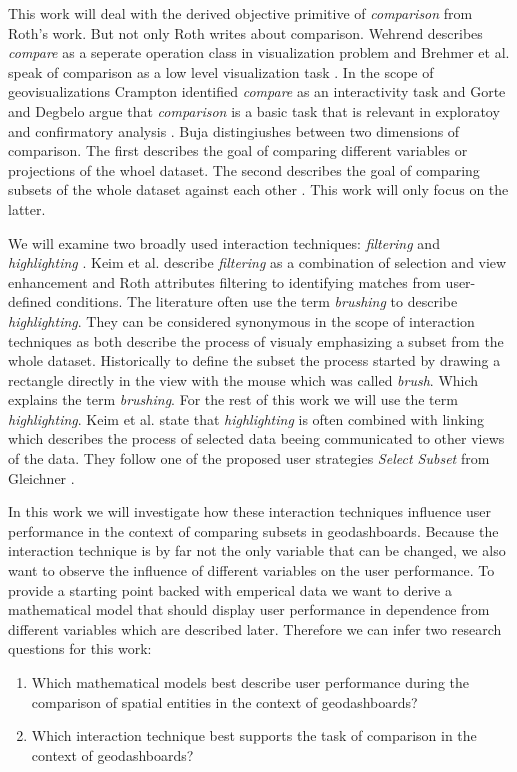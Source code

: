 This work will deal with the derived objective primitive of \textit{comparison} from Roth's work.
But not only Roth writes about comparison. Wehrend describes \textit{compare} as a seperate
operation class in visualization problem \citep{Wehrend.1990} and Brehmer et al.
speak of comparison as a low level visualization task \citep*{Brehmer.2013}. In the
scope of geovisualizations Crampton identified \textit{compare} as an interactivity task
\citep{Crampton.2002} and Gorte and Degbelo argue that \textit{comparison} is a basic
task that is relevant in exploratoy and confirmatory analysis \citep{Gorte.2022}.
Buja distingiushes between two dimensions of comparison. The first
describes the goal of comparing different variables or projections of the whoel dataset.
The second describes the goal of comparing subsets of the whole dataset against each
other \citep*{Buja.1996}. This work will only focus on the latter. 

We will examine two broadly used interaction techniques: \textit{filtering} and
\textit{highlighting} \citep*{Keim.2005,Roth.2013}. Keim et al. describe \textit{filtering} as a
combination of selection and view enhancement and Roth attributes filtering to identifying matches
from user-defined conditions. The literature often use the term \textit{brushing} 
to describe \textit{highlighting}. They can be considered synonymous in the scope of interaction techniques
as both describe the process of visualy emphasizing a subset from the whole dataset.
Historically to define the subset the process started by drawing a rectangle directly in the view with the
mouse which was called \textit{brush}. Which explains the term \textit{brushing}.
For the rest of this work we will use the term \textit{highlighting}. Keim et al. state
that \textit{highlighting} is often combined with linking which describes the process of selected data
beeing communicated to other views of the data. They follow one of the proposed user strategies
\textit{Select Subset} from Gleichner \citep*{Gleicher.2018}.

In this work we will investigate how these interaction techniques influence user performance
in the context of comparing subsets in geodashboards. Because the interaction technique is
by far not the only variable that can be changed, we also want to observe the influence of
different variables on the user performance. To provide a starting point backed with emperical
data we want to derive a mathematical model that should display user performance in dependence
from different variables which are described later. Therefore we can infer two research
questions for this work:
\begin{enumerate}
    \item Which mathematical models best describe user performance during the comparison of spatial entities
    in the context of geodashboards?
    \item Which interaction technique best supports the task of comparison in the context of
    geodashboards? 
\end{enumerate}

